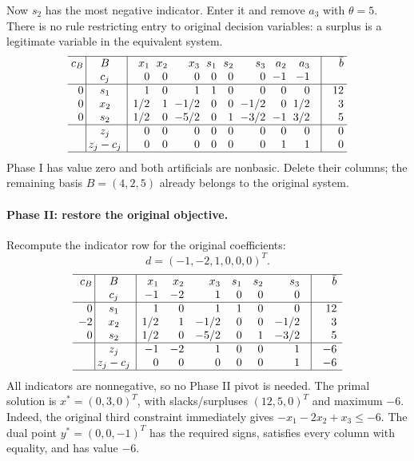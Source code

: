 \documentclass[11pt,a4paper]{article}
\begin{document}
Now $s_2$ has the most negative indicator. Enter it and remove $a_3$
with $\theta=5$.
There is no rule restricting entry to original decision variables: a surplus
is a legitimate variable in the equivalent system.
\[
  \setlength{\arraycolsep}{3pt}
  \begin{array}{r@{\hspace{0.2em}}|@{\hspace{0.2em}}c@{\enspace}|@{\enspace}rrrrrrrr@{\quad}|@{\quad}r}\hline
    c_B & B & x_1 & x_2 & x_3 & s_1 & s_2 & s_3 & a_2 & a_3 & \bar b\\
    & c_j & 0 & 0 & 0 & 0 & 0 & 0 & -1 & -1 & \\
    \hline
    0 & s_1 & 1 & 0 & 1 & 1 & 0 & 0 & 0 & 0 & 12\\
    0 & x_2 & 1/2 & 1 & -1/2 & 0 & 0 & -1/2 & 0 & 1/2 & 3\\
    0 & s_2 & 1/2 & 0 & -5/2 & 0 & 1 & -3/2 & -1 & 3/2 & 5\\
    \hline
    & z_j & 0 & 0 & 0 & 0 & 0 & 0 & 0 & 0 & 0\\
    & z_j-c_j & 0 & 0 & 0 & 0 & 0 & 0 & 1 & 1 & 0\\
    \hline
  \end{array}
\]
Phase I has value zero and both artificials are nonbasic. Delete their
columns; the remaining basis $B=(4,2,5)$ already belongs to the original system.

\paragraph{Phase II: restore the original objective.}
Recompute the indicator row for the original coefficients:
\[
  d=(-1,-2,1,0,0,0)^T.
\]
\[
  \begin{array}{r@{\hspace{0.2em}}|@{\hspace{0.2em}}c@{\enspace}|@{\enspace}rrrrrr@{\quad}|@{\quad}r}\hline
    c_B & B & x_1 & x_2 & x_3 & s_1 & s_2 & s_3 & \bar b\\
    & c_j & -1 & -2 & 1 & 0 & 0 & 0 & \\
    \hline
    0 & s_1 & 1 & 0 & 1 & 1 & 0 & 0 & 12\\
    -2 & x_2 & 1/2 & 1 & -1/2 & 0 & 0 & -1/2 & 3\\
    0 & s_2 & 1/2 & 0 & -5/2 & 0 & 1 & -3/2 & 5\\
    \hline
    & z_j & -1 & -2 & 1 & 0 & 0 & 1 & -6\\
    & z_j-c_j & 0 & 0 & 0 & 0 & 0 & 1 & -6\\
    \hline
  \end{array}
\]
All indicators are nonnegative, so no Phase II pivot is needed.
The primal solution is $x^*=(0,3,0)^T$, with slacks/surpluses $(12,5,0)^T$
and maximum $-6$. Indeed, the original third constraint immediately gives
$-x_1-2x_2+x_3\leq-6$.
The dual point $y^*=(0,0,-1)^T$ has the required signs, satisfies every
column with equality, and has value $-6$.
\end{document}
